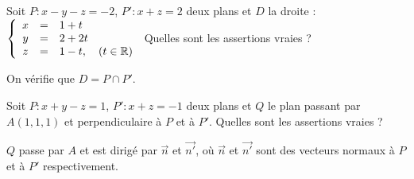\begin{question} 

Soit $P : x-y-z=-2$,  $P' : x+z=2$ deux plans et $D$ la droite :
$\left\{\begin{array}{ccl}x&=&1+t\\y&=&2+2t\\ z&=&1-t,\quad (t\in \mathbb{R})\end{array}\right.$ Quelles sont les assertions vraies ?
\begin{answers}


 
    
 
\end{answers}
\begin{explanations}
On vérifie que  $D=P\cap P'$.
\end{explanations}

\end{question}


\begin{question} 
  
Soit $P : x+y-z=1$,  $P' : x+z=-1$ deux plans et $Q$ le plan passant par $A(1,1,1)$ et perpendiculaire à $P$ et à $P'$. Quelles sont les assertions vraies ?
\begin{answers}


 
    
    
\end{answers}

\begin{explanations}
$Q$ passe par $A$ et est dirigé par $\vec{n}$ et $\vec{n'}$, où $\vec{n}$ et $\vec{n'}$ sont des vecteurs normaux à $P$ et à $P'$ respectivement.
\end{explanations}

\end{question}




